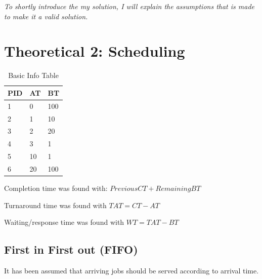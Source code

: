 \documentclass[11pt,a4paper]{article}
\theoremstyle{plain}
\theoremstyle{definition}
\theoremstyle{remark}
\numberwithin{equation}{section}
\begin{document}
\textit{To shortly introduce the my solution, I will explain the assumptions that is made to make it a valid solution.}




\section*{Theoretical 2: Scheduling}

\begin{table}[H]
	\centering
	\caption{Basic Info Table}
	\label{sch-basic}
	\begin{tabular}{lll}
		\hline
		\multicolumn{1}{|l|}{PID} & \multicolumn{1}{l|}{AT} & \multicolumn{1}{l|}{BT} \\ \hline
		1                         & 0                       & 100                     \\
		2                         & 1                       & 10                      \\
		3                         & 2                       & 20                      \\
		4                         & 3                       & 1                       \\
		5                         & 10                      & 1                       \\
		6                         & 20                      & 100                    
	\end{tabular}
\end{table}


Completion time was found with: $PreviousCT+RemainingBT$

Turnaround time was found with $TAT = CT-AT$

Waiting/response time was found with $WT = TAT-BT$


\subsection*{First in First out (FIFO)} %

It has been assumed that arriving jobs should be served according to arrival time.
\end{document}
